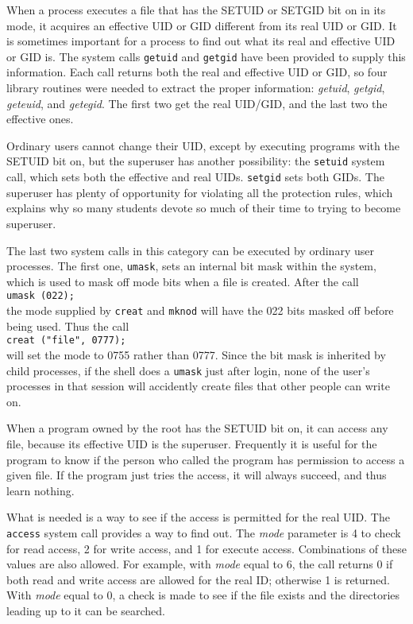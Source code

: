 \documentclass{book}
\newcommand {\sys} [1] {\textsl{#1}}
\newcommand {\cmd} [1] {\texttt{#1}}
\begin{document}
When a process executes a file that has the SETUID or SETGID bit on in its mode,
it acquires an effective UID or GID different from its real UID or GID.
It is sometimes important for a process to find out what its real and effective UID or GID is.
The system calls \cmd{getuid} and \cmd{getgid} have been provided to supply this information.
Each call returns both the real and effective UID or GID, so four library routines were needed to extract the proper information:
\sys{getuid}, \sys{getgid}, \sys{geteuid}, and \sys{getegid}.
The first two get the real UID/GID, and the last two the effective ones.

Ordinary users cannot change their UID, except by executing programs with the SETUID bit on,
but the superuser has another possibility: the \cmd{setuid} system call, which sets both the effective and real UIDs. 
\cmd{setgid} sets both GIDs.
The superuser has plenty of opportunity for violating all the protection rules,
which explains why so many students devote so much of their time to trying to become superuser.

The last two system calls in this category can be executed by ordinary user processes.
The first one, \cmd{umask}, sets an internal bit mask within the system, which is used to mask off mode bits when a file is created.
After the call\\
\cmd{umask (022);}\\
the mode supplied by \cmd{creat} and \cmd{mknod} will have the 022 bits masked off before being used.
Thus the call\\
\cmd{creat ("file", 0777);}\\
will set the mode to 0755 rather than 0777.
Since the bit mask is inherited by child processes, if the shell does a \cmd{umask} just after login, 
none of the user's processes in that session will accidently create files that other people can write on.
 
When a program owned by the root has the SETUID bit on, it can access any file, because its effective UID is the superuser.
Frequently it is useful for the program to know if the person who called the program has permission to access a given file.
If the program just tries the access, it will always succeed, and thus learn nothing.

What is needed is a way to see if the access is permitted for the real UID.
The \cmd{access} system call provides a way to find out.
The \sys{mode} parameter is 4 to check for read access, 2 for write access, and 1 for execute access.
Combinations of these values are also allowed.
For example, with \sys{mode} equal to 6, the call returns 0 if both read and write access are allowed for the real ID;
otherwise 1 is returned.
With \sys{mode} equal to 0, a check is made to see if the file exists and the directories leading up to it can be searched.
\end{document}
